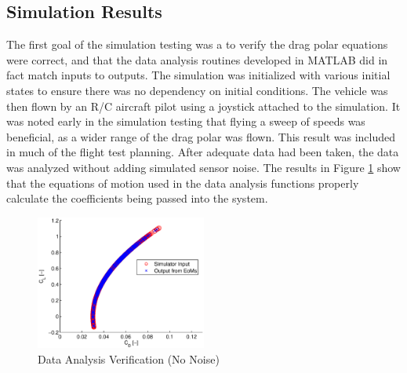 \subsection*{Simulation Results}
The first goal of the simulation testing was a to verify the drag polar equations were correct, and that the data analysis routines developed in MATLAB did in fact match inputs to outputs. The simulation was initialized with various initial states to ensure there was no dependency on initial conditions. The vehicle was then flown by an R/C aircraft pilot using a joystick attached to the simulation. It was noted early in the simulation testing that flying a sweep of speeds was beneficial, as a wider range of the drag polar was flown. This result was included in much of the flight test planning. After adequate data had been taken, the data was analyzed without adding simulated sensor noise. The results in Figure \ref{dragPolarNoNoise} show that the equations of motion used in the data analysis functions properly calculate the coefficients being passed into the system.

\begin{figure}[H]
  \centering
  
    \includegraphics[width=0.5\textwidth]{figures/dragPolarNoNoise.eps}
    \caption{Data Analysis Verification (No Noise)}
        \label{dragPolarNoNoise}
\end{figure}


